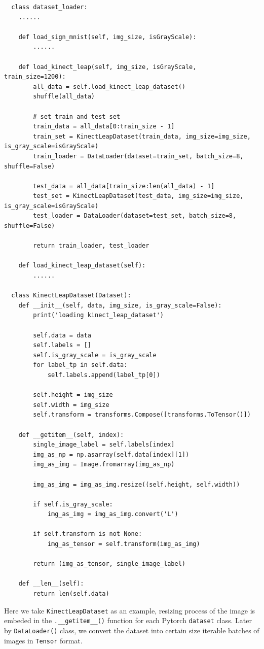 \documentclass[12pt]{article}
\begin{document}
\begin{lstlisting}
  class dataset_loader:
    ......

    def load_sign_mnist(self, img_size, isGrayScale):
        ......

    def load_kinect_leap(self, img_size, isGrayScale, train_size=1200):
        all_data = self.load_kinect_leap_dataset()
        shuffle(all_data)

        # set train and test set
        train_data = all_data[0:train_size - 1]
        train_set = KinectLeapDataset(train_data, img_size=img_size, is_gray_scale=isGrayScale)
        train_loader = DataLoader(dataset=train_set, batch_size=8, shuffle=False)

        test_data = all_data[train_size:len(all_data) - 1]
        test_set = KinectLeapDataset(test_data, img_size=img_size, is_gray_scale=isGrayScale)
        test_loader = DataLoader(dataset=test_set, batch_size=8, shuffle=False)

        return train_loader, test_loader

    def load_kinect_leap_dataset(self):
        ......
    
  class KinectLeapDataset(Dataset):
    def __init__(self, data, img_size, is_gray_scale=False):
        print('loading kinect_leap_dataset')

        self.data = data
        self.labels = []
        self.is_gray_scale = is_gray_scale
        for label_tp in self.data:
            self.labels.append(label_tp[0])

        self.height = img_size
        self.width = img_size
        self.transform = transforms.Compose([transforms.ToTensor()])

    def __getitem__(self, index):
        single_image_label = self.labels[index]
        img_as_np = np.asarray(self.data[index][1])
        img_as_img = Image.fromarray(img_as_np)

        img_as_img = img_as_img.resize((self.height, self.width))

        if self.is_gray_scale:
            img_as_img = img_as_img.convert('L')

        if self.transform is not None:
            img_as_tensor = self.transform(img_as_img)

        return (img_as_tensor, single_image_label)

    def __len__(self):
        return len(self.data)
\end{lstlisting}

Here we take \verb|KinectLeapDataset| as an example, resizing process of the image is embeded in the \verb|.__getitem__()| function for each Pytorch \verb|dataset| class. Later by \verb|DataLoader()| class, we convert the dataset into certain size iterable batches of images in \verb|Tensor| format.
\end{document}
